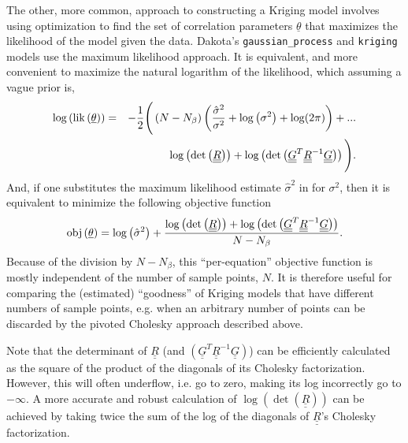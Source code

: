 The other, more common, approach to constructing a Kriging model 
involves using optimization to find the set of correlation parameters 
$\underline{\theta}$ that maximizes the likelihood of the model given 
the data.  Dakota's \texttt{gaussian\_process} and \texttt{kriging} models
use the maximum likelihood approach.  It is equivalent, and more
convenient to maximize the natural logarithm of the likelihood, which 
assuming a vague prior is,
\begin{eqnarray*}
\log\left({\rm lik}\left(\underline{\theta}\right)\right)&=&-\frac{1}{2}\Bigg(\left(N-N_{\beta}\right)\left(\frac{\hat{\sigma}^2}{\sigma^2}+\log\left(\sigma^2\right)+\log(2\pi)\right)+...\\
&& \hspace{0.4truein}\log\left(\det\left(\underline{\underline{R}}\right)\right)+\log\left(\det\left(\underline{\underline{G}}^T\underline{\underline{R}}^{-1}\underline{\underline{G}}\right)\right)\Bigg).
\end{eqnarray*}
And, if one substitutes the maximum likelihood estimate $\hat{\sigma}^2$ in
for $\sigma^2$, then it is equivalent to minimize the following objective 
function
\begin{displaymath}
{\rm obj}\left(\underline{\theta}\right)=\log\left(\hat{\sigma}^2\right)+\frac{\log\left(\det\left(\underline{\underline{R}}\right)\right)+\log\left(\det\left(\underline{\underline{G}}^T\underline{\underline{R}}^{-1}\underline{\underline{G}}\right)\right)}{N-N_{\beta}}.
\end{displaymath}
Because of the division by $N-N_{\beta}$, this ``per-equation'' objective 
function is mostly independent of the number of sample points, $N$.  It is 
therefore useful for comparing the (estimated) ``goodness'' of Kriging 
models that have different numbers of sample points, e.g. when an arbitrary
number of points can be discarded by the pivoted Cholesky approach described
above.\newline

Note that the determinant of $\underline{\underline{R}}$ (and 
$\left(\underline{\underline{G}}^T\underline{\underline{R}}^{-1}\underline{\underline{G}}\right)$) 
can be efficiently calculated as the square of the product of the diagonals 
of its Cholesky factorization.  However, this will often underflow, i.e. 
go to zero, making its log incorrectly go to $-\infty$.  A more accurate and 
robust calculation of 
$\log\left(\det\left(\underline{\underline{R}}\right)\right)$ 
can be achieved by taking twice the sum of the log of the 
diagonals of $\underline{\underline{R}}$'s Cholesky factorization. 
\newline

